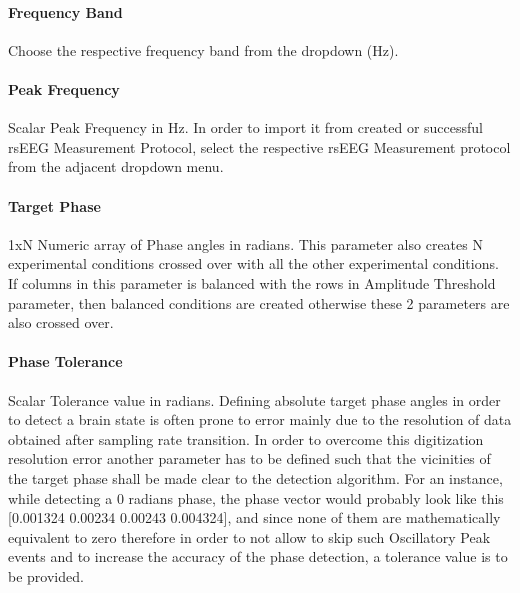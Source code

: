\documentclass[letterpaper,10pt,english]{sphinxmanual}
\begin{document}
\paragraph{Frequency Band}
\label{\detokenize{15_SensoryThresholdHunting:frequency-band}}
\sphinxAtStartPar
Choose the respective frequency band from the dropdown (Hz).


\paragraph{Peak Frequency}
\label{\detokenize{15_SensoryThresholdHunting:peak-frequency}}
\sphinxAtStartPar
Scalar Peak Frequency in Hz. In order to import it from created or successful rsEEG Measurement Protocol, select the respective rsEEG Measurement protocol from the adjacent dropdown menu.


\paragraph{Target Phase}
\label{\detokenize{15_SensoryThresholdHunting:target-phase}}
\sphinxAtStartPar
1xN Numeric array of Phase angles in radians. This parameter also creates N experimental conditions crossed over with all the other experimental conditions. If columns in this parameter is balanced with the rows in Amplitude Threshold parameter, then balanced conditions are created otherwise these 2 parameters are also crossed over.


\paragraph{Phase Tolerance}
\label{\detokenize{15_SensoryThresholdHunting:phase-tolerance}}
\sphinxAtStartPar
Scalar Tolerance value in radians. Defining absolute target phase angles in order to detect a brain state is often prone to error mainly due to the resolution of data obtained after sampling rate transition. In order to overcome this digitization resolution error another parameter has to be defined such that the vicinities of the target phase shall be made clear to the detection algorithm. For an instance, while detecting a 0 radians phase, the phase vector would probably look like this {[}\sphinxhyphen{}0.001324 \sphinxhyphen{}0.00234 0.00243 0.004324{]}, and since none of them are mathematically equivalent to zero therefore in order to not allow to skip such Oscillatory Peak events and to increase the accuracy of the phase detection, a tolerance value is to be provided.
\end{document}
